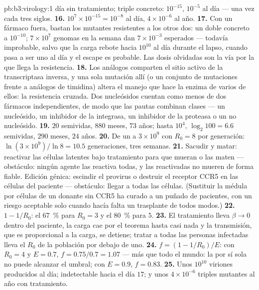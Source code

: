 \begin{solution}{pb:b3:virology:1}
día sin tratamiento; triple concreto: $10^{-15}$, $10^{-5}$ al día ---
una vez cada tres siglos.
\textbf{16.} $10^{7}\times 10^{-15} = 10^{-8}$ al día, $4\times 10^{-6}$
al año.
\textbf{17.} Con un fármaco fuera, bastan los mutantes resistentes a los
otros dos: un doble concreto a $10^{-10}$; $7\times 10^{7}$ genomas en la
semana dan $7\times 10^{-3}$ esperados --- todavía improbable, salvo que
la carga rebote hacia $10^{10}$ al día durante el lapso, cuando pasa a
ser uno al día y el escape es probable. Las dosis olvidadas son la vía
por la que llega la resistencia.
\textbf{18.} Los análogos comparten el sitio activo de la transcriptasa
inversa, y una sola mutación allí (o un conjunto de mutaciones frente a
análogos de timidina) altera el manejo que hace la enzima de varios de
ellos: la resistencia cruzada. Dos nucleósidos cuentan como menos de dos
fármacos independientes, de modo que las pautas combinan clases --- un
nucleósido, un inhibidor de la integrasa, un inhibidor de la proteasa o
un no nucleósido.
\textbf{19.} $20$ semividas, $880$ meses, $73$ años; hasta $10^{4}$,
$\log_{2}100 = 6.6$ semividas, $290$ meses, $24$ años.
\textbf{20.} De un  a $3\times 10^{9}$ con $R_{0} = 8$ por
generación: $\ln(3\times 10^{9})/\ln 8 = 10.5$ generaciones, tres
semanas.
\textbf{21.} Sacudir y matar: reactivar las células latentes bajo
tratamiento para que mueran o las maten --- obstáculo: ningún agente las
reactiva todas, y las reactivadas no mueren de forma fiable. Edición
génica: escindir el provirus o destruir el receptor CCR5 en las células
del paciente --- obstáculo: llegar a todas las células. (Sustituir la
médula por células de un donante sin CCR5 ha curado a un puñado de
pacientes, con un riesgo aceptable solo cuando hacía falta un trasplante
de todos modos.)
\textbf{22.} $1 - 1/R_{0}$: el \qty{67}{\%} para $R_{0} = 3$ y el
\qty{80}{\%} para $5$.
\textbf{23.} El tratamiento lleva $\beta \to 0$ dentro del paciente, la
carga cae por el teorema hasta casi nada y la transmisión, que es
proporcional a la carga, se detiene; tratar a todas las personas
infectadas lleva el $R_{0}$ de la población por debajo de uno.
\textbf{24.} $f = (1 - 1/R_{0})/E$: con $R_{0} = 4$ y $E = 0.7$, $f =
0.75/0.7 = 1.07$ --- más que todo el mundo: la  por sí sola no
puede alcanzar el umbral; con $E = 0.9$, $f = 0.83$.
\textbf{25.} Unos $10^{10}$ viriones producidos al día; indetectable
hacia el día $17$; y unos $4\times 10^{-6}$ triples mutantes al año con
tratamiento.
\end{solution}
